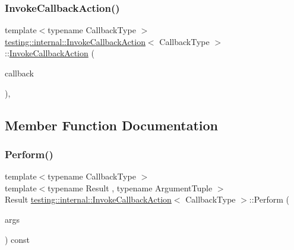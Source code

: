\subsubsection{\texorpdfstring{InvokeCallbackAction()}{InvokeCallbackAction()}}
{\footnotesize\ttfamily template$<$typename Callback\+Type $>$ \\
\mbox{\hyperlink{classtesting_1_1internal_1_1_invoke_callback_action}{testing\+::internal\+::\+Invoke\+Callback\+Action}}$<$ Callback\+Type $>$\+::\mbox{\hyperlink{classtesting_1_1internal_1_1_invoke_callback_action}{Invoke\+Callback\+Action}} (\begin{DoxyParamCaption}\item[{Callback\+Type $\ast$}]{callback }\end{DoxyParamCaption})\hspace{0.3cm}{\ttfamily [inline]}, {\ttfamily [explicit]}}



\subsection{Member Function Documentation}
\mbox{\label{classtesting_1_1internal_1_1_invoke_callback_action_a74278acbfc51fe7407fdabc9d6a42c70}} 
\subsubsection{\texorpdfstring{Perform()}{Perform()}}
{\footnotesize\ttfamily template$<$typename Callback\+Type $>$ \\
template$<$typename Result , typename Argument\+Tuple $>$ \\
Result \mbox{\hyperlink{classtesting_1_1internal_1_1_invoke_callback_action}{testing\+::internal\+::\+Invoke\+Callback\+Action}}$<$ Callback\+Type $>$\+::Perform (\begin{DoxyParamCaption}\item[{const Argument\+Tuple \&}]{args }\end{DoxyParamCaption}) const\hspace{0.3cm}{\ttfamily [inline]}}



